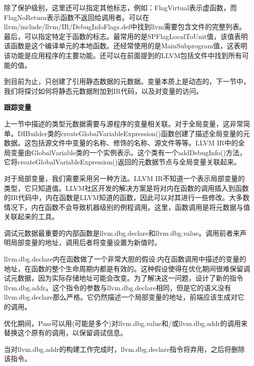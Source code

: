 除了保护级别，这里还可以指定其他标志，例如：FlagVirtual表示虚函数，而FlagNoReturn表示函数不返回给调用者。可以在llvm/include/llvm/IR/DebugInfoFlags.def中找到llvm需要包含文件的完整列表。最后，可以指定特定于函数的标志。最常用的是SPFlagLocalToUnit值，该值表明该函数是这个编译单元的本地函数。还经常使用的是MainSubprogram值，这表明该功能是应用程序的主要功能。还可以在前面提到的LLVM包括文件中找到所有可能的值。\par

到目前为止，只创建了引用静态数据的元数据。变量本质上是动态的，下一节中，我们将探讨如何将静态元数据附加到IR代码，以及对变量的访问。\par

\hspace*{\fill} \par %
\textbf{跟踪变量}

上一节中描述的类型元数据需要与源程序的变量相关联。对于全局变量，这非常简单。DIBuilder类的createGlobalVariableExpression()函数创建了描述全局变量的元数据。这包括源文件中变量的名称、修饰的名称、源文件等等。LLVM IR中的全局变量由GlobalVariable类的一个实例表示。这个类有一个addDebugInfo()方法，它将createGlobalVariableExpression()返回的元数据节点与全局变量关联起来。\par

对于局部变量，我们需要采用另一种方法。LLVM IR不知道一个表示局部变量的类型，它只知道值。LLVM社区开发的解决方案是将对内在函数的调用插入到函数的IR代码中，内在函数是LLVM知道的函数，因此可以对其进行一些修改。大多数情况下，内在函数不会导致机器级别的例程调用。这里，函数调用是将元数据与值关联起来的工具。\par

调试元数据最重要的内部函数是llvm.dbg.declare和llvm.dbg.value。调用前者来声明局部变量的地址，调用后者将变量设置为新值时。\par

\begin{tcolorbox}[colback=blue!5!white,colframe=blue!75!black, title=以后的LLVM版本将用llvm.dbg.addr指令替换llvm.dbg.declare]
	
\hspace*{0.7cm}llvm.dbg.declare内在函数做了一个非常大胆的假设:内在函数调用中描述的变量的地址，在函数的整个生命周期内都是有效的。这种假设使得在优化期间很难保留调试元数据，因为实际存储地址可能会改变。为了解决这一问题，设计了新的指令llvm.dbg.addr。这个指令的参数与llvm.dbg.declare相同，但是它的语义没有llvm.dbg.declare那么严格。它仍然描述一个局部变量的地址，前端应该生成对它的调用。\par

\hspace*{0.7cm}优化期间，Pass可以用(可能是多个)对llvm.dbg.value和/或llvm.dbg.addr的调用来替换这个原有的调用，以保留调试信息。\par

\hspace*{0.7cm}当对llvm.dbg.addr的构建工作完成时，llvm.dbg.declare指令将弃用，之后将删除该指令。

\end{tcolorbox}

